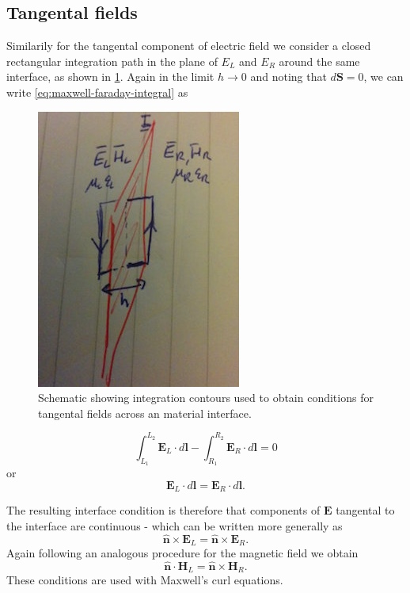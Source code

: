 \subsection{Tangental fields}

Similarily for the tangental component of electric field we consider a closed rectangular integration path in the plane of $E_L$ and $E_R$ around the same interface, as shown in \ref{fig:material-interface-derivation:E-rectangular-loop}. Again in the limit $h \to 0$ and noting that $d\mathbf{S} = 0$, we can write \ref{eq:maxwell-faraday-integral} as
\begin{figure}[htbp!]
\begin{center}
    \includegraphics[scale=0.9]{Figures/Chapters/PhysicalProblem/interfaceContour}
\end{center}
\caption{Schematic showing integration contours used to obtain conditions for tangental fields across an material interface.}
\label{fig:material-interface-derivation:E-rectangular-loop}
\end{figure}
\begin{equation}
\label{eq:material-interfaces-tangentalcondition-E}
\int_{L_1}^{L_2} \mathbf{E}_L \cdot d\mathbf{l} - \int_{R_1}^{R_2} \mathbf{E}_R \cdot d \mathbf{l} = 0
\end{equation}
or
$$
\mathbf{E}_L \cdot d\mathbf{l} = \mathbf{E}_R \cdot d \mathbf{l} .
$$

The resulting interface condition is therefore that components of $\mathbf{E}$ tangental to the interface are continuous - which can be written more generally as
$$
\hat{\mathbf{n}} \times \mathbf{E}_L = \hat{\mathbf{n}} \times \mathbf{E}_R .
$$
Again following an analogous procedure for the magnetic field we obtain
$$
\hat{\mathbf{n}} \cdot \mathbf{H}_L = \hat{\mathbf{n}} \times \mathbf{H}_R .
$$
These conditions are used with Maxwell's curl equations.

